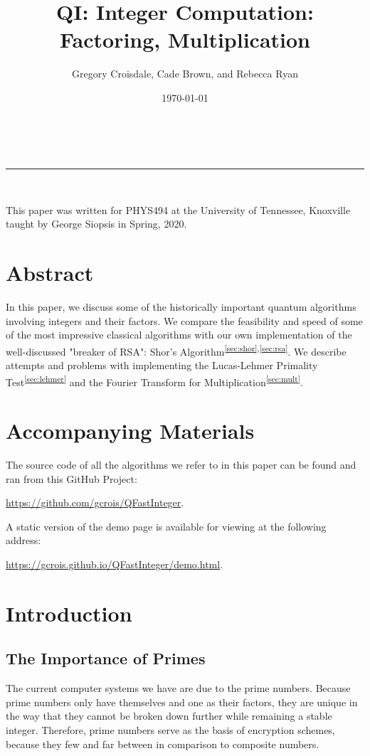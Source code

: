 \documentclass[a4paper,11pt]{article}
\makeatletter
\newcommand{\linia}{\rule{\linewidth}{0.5pt}}
\theoremstyle{mytheor}
\renewcommand{\maketitle}{
\begin{center}
\vspace{2ex}
{\huge \textsc{\@title}}
\vspace{1ex}
\\
\linia\\
\@author \hfill \@date
\vspace{4ex}
\end{center}
}
\makeatother
\begin{document}
\title{QI: Integer Computation: Factoring, Multiplication}

\author{Gregory Croisdale, Cade Brown, and Rebecca Ryan}

\date{\today}

\maketitle

\begin{center}
    This paper was written for PHYS494 at the University of Tennessee, Knoxville taught by George Siopsis in Spring, 2020.
\end{center}

\tableofcontents

\section{Abstract}
In this paper, we discuss some of the historically important quantum algorithms involving integers and their factors. We compare the feasibility and speed of some of the most impressive classical algorithms with our own implementation of the well-discussed "breaker of RSA": Shor's Algorithm\textsuperscript{\ref{sec:shor},\ref{sec:rsa}}. We describe attempts and problems with implementing the Lucas-Lehmer Primality Test\textsuperscript{\ref{sec:lehmer}} and the Fourier Transform for Multiplication\textsuperscript{\ref{sec:mult}}.


\section{Accompanying Materials}
The source code of all the algorithms we refer to in this paper can be found and ran from this GitHub Project:
\begin{center}
\url{https://github.com/gcrois/QFastInteger}.
\end{center}

A static version of the demo page is available for viewing at the following address:
\begin{center}
    \url{https://gcrois.github.io/QFastInteger/demo.html}.
\end{center}

\section{Introduction}\label{sec:intro}


\subsection{The Importance of Primes}
\cite{C5}\cite{Prime}\cite{QLect}
The current computer systems we have are due to the prime numbers.  Because prime numbers only have themselves and one as their factors, they are unique in the way that they cannot be broken down further while remaining a stable integer.  Therefore, prime numbers serve as the basis of encryption schemes, because they few and far between in comparison to composite numbers.  
\end{document}
